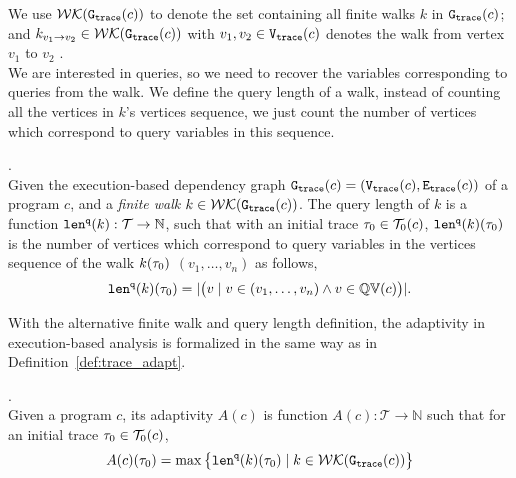   We use $\mathcal{WK}(\mathtt{{G_{trace}}}(c))$ to denote 
  the set containing all finite walks $k$ in $\mathtt{{G_{trace}}}(c)$;
  and $k_{v_1 \to v_2} \in \mathcal{WK}(\mathtt{{G_{trace}}}(c))$ with $v_1, v_2 \in \mathtt{{V_{trace}}}(c)$ denotes the walk from vertex $v_1$ to $v_2$ . 
  \\
  We are interested in queries, so we need to recover the 
  variables corresponding to queries from the walk. We define the query length of a walk, 
  instead of counting all 
  the vertices in $k$'s vertices sequence, we just count the number of vertices which correspond to query variables in this sequence.
  \begin{defn}.
  \label{def:qlen}
  \\
  Given 
  the execution-based dependency graph 
  $\mathtt{{G_{trace}}}({c}) = (\mathtt{{V_{trace}}}({c}), \mathtt{{E_{trace}}}({c}))$ of a program $c$,
   and a \emph{finite walk} 
   $k \in \mathcal{WK}(\mathtt{{G_{trace}}}(c))$. 
  The query length of $k$ is a function $\mathtt{len}^{\tt q}(k): \mathcal{T} \to \mathbb{N}$, such that with an initial trace  $\mathtt{\tau}_0 \in \mathcal{T}_0(c)$, $\mathtt{len}^{\tt q}(k)(\mathtt{\tau}_0)$ is
  the number of vertices which correspond to query variables in the vertices sequence of the walk $k(\mathtt{\tau}_0)$
  $(v_1, \ldots, v_{n})$ as follows, 
  \[
    \mathtt{len}^{\tt q}(k)(\mathtt{\tau}_0) = |\big( v \mid v \in (v_1, \ldots, v_{n}) \land v \in \mathbb{QV}(c) \big)|.
  \]
  \end{defn}
%
With the alternative finite walk and query length definition, the adaptivity in execution-based analysis 
is formalized in the same way as in Definition~\ref{def:trace_adapt}.
\begin{defn}
    .
    \\
    Given a program ${c}$, 
    its adaptivity $A(c)$ is function 
    $A(c) : \mathcal{T} \to \mathbb{N}$ such that for an
    initial trace $\mathtt{\tau}_0 \in \mathcal{T}_0(c)$, 
   $$
    A(c)(\mathtt{\tau}_0) = \max \big 
    \{ \mathtt{len}^{\tt q}(k)(\mathtt{\tau}_0) \mid k \in \mathcal{WK}(\mathtt{{G_{trace}}}(c)) \big \} $$
    \end{defn}


